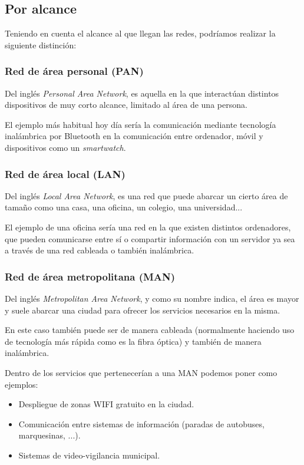 \subsection{Por alcance}
Teniendo en cuenta el alcance al que llegan las redes, podríamos realizar la siguiente distinción:

\subsubsection{Red de área personal (PAN)}
Del inglés \textit{Personal Area Network}, es aquella en la que interactúan distintos dispositivos de muy corto alcance, limitado al área de una persona.

El ejemplo más habitual hoy día sería la comunicación mediante tecnología inalámbrica por Bluetooth en la comunicación entre ordenador, móvil y dispositivos como un \textit{smartwatch}.


\subsubsection{Red de área local (LAN)}
Del inglés \textit{Local Area Network}, es una red que puede abarcar un cierto área de tamaño como una casa, una oficina, un colegio, una universidad...

El ejemplo de una oficina sería una red en la que existen distintos ordenadores, que pueden comunicarse entre sí o compartir información con un servidor ya sea a través de una red cableada o también inalámbrica.

\subsubsection{Red de área metropolitana (MAN)}
Del inglés \textit{Metropolitan Area Network}, y como su nombre indica, el área es mayor y suele abarcar una ciudad para ofrecer los servicios necesarios en la misma.

En este caso también puede ser de manera cableada (normalmente haciendo uso de tecnología más rápida como es la fibra óptica) y también de manera inalámbrica.

Dentro de los servicios que pertenecerían a una MAN podemos poner como ejemplos:
\begin{itemize}
    \item Despliegue de zonas WIFI gratuito en la ciudad.
    \item Comunicación entre sistemas de información (paradas de autobuses, marquesinas, ...).
    \item Sistemas de video-vigilancia municipal.
\end{itemize}

